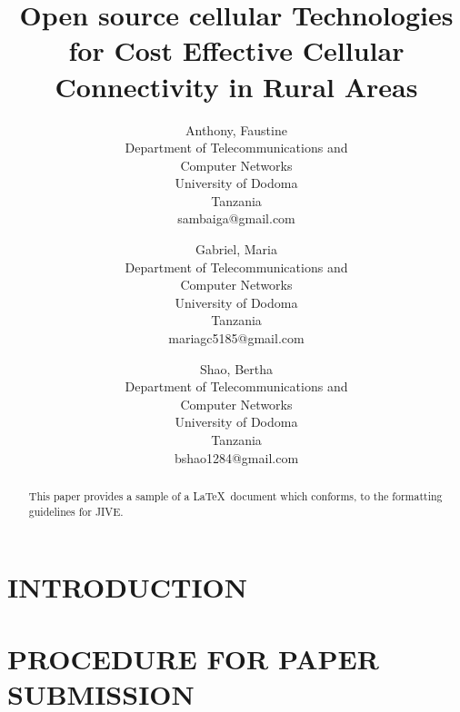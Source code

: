 \documentclass{jiveArticle}
\begin{document}
\title{Open source cellular Technologies for Cost Effective Cellular Connectivity in Rural Areas} %

\author{ 
   \large Anthony, Faustine \\[-3pt]
   \normalsize Department of Telecommunications and \\ Computer Networks
  \\[-3pt]
    \normalsize University of Dodoma \\[-3pt]
    \normalsize Tanzania \\[-3pt]
    \normalsize	sambaiga@gmail.com \\[-3pt]
  \and
   \large Gabriel, Maria \\[-3pt]
   \normalsize Department of Telecommunications and \\ Computer Networks  \\[-3pt]
    \normalsize University of Dodoma \\[-3pt]
    \normalsize Tanzania \\[-3pt]
    \normalsize	mariagc5185@gmail.com \\[-3pt]
\and
   \large Shao, Bertha \\[-3pt]
   \normalsize Department of Telecommunications and \\ Computer Networks  \\[-3pt]
    \normalsize University of Dodoma \\[-3pt]
    \normalsize Tanzania \\[-3pt]
    \normalsize	bshao1284@gmail.com \\[-3pt]
}


\maketitle



\begin{abstract} 
This paper provides a sample of a \LaTeX\ document which conforms,
to the formatting guidelines for JIVE. 
\end{abstract}

\section{INTRODUCTION}

\section{PROCEDURE FOR PAPER SUBMISSION}
\end{document}
